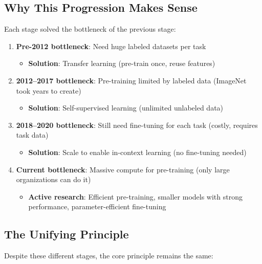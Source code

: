 \documentclass{article}
\begin{document}
\subsection{Why This Progression Makes Sense}

Each stage solved the bottleneck of the previous stage:

\begin{enumerate}
\item \textbf{Pre-2012 bottleneck}: Need huge labeled datasets per task
\begin{itemize}
\item \textbf{Solution}: Transfer learning (pre-train once, reuse features)
\end{itemize}

\item \textbf{2012--2017 bottleneck}: Pre-training limited by labeled data (ImageNet took years to create)
\begin{itemize}
\item \textbf{Solution}: Self-supervised learning (unlimited unlabeled data)
\end{itemize}

\item \textbf{2018--2020 bottleneck}: Still need fine-tuning for each task (costly, requires task data)
\begin{itemize}
\item \textbf{Solution}: Scale to enable in-context learning (no fine-tuning needed)
\end{itemize}

\item \textbf{Current bottleneck}: Massive compute for pre-training (only large organizations can do it)
\begin{itemize}
\item \textbf{Active research}: Efficient pre-training, smaller models with strong performance, parameter-efficient fine-tuning
\end{itemize}
\end{enumerate}

\subsection{The Unifying Principle}

Despite these different stages, the core principle remains the same:
\end{document}
